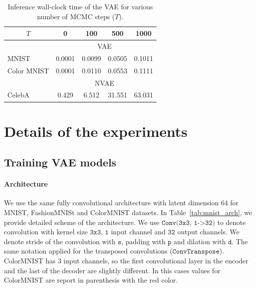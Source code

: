 \begin{table}[ht]
\begin{center}
\begin{small}
\begin{sc}
\caption{Inference wall-clock time of the VAE for various number of MCMC steps ($T$).}
\label{tab:inferece_time}
\begin{tabular}{l|cccc}
\toprule
\multicolumn{1}{c|}{$T$} &  0 & 100 & 500 &  1000 \\
\midrule
 & \multicolumn{4}{c}{VAE} \\
MNIST & 0.0001 & 0.0099 & 0.0505 & 0.1011\\
Color MNIST & 0.0001& 0.0110 & 0.0553 & 0.1111\\
\midrule
& \multicolumn{4}{c}{NVAE}  \\
CelebA & 0.429 & 6.512 & 31.551 & 63.031\\
\bottomrule
\end{tabular}  
\end{sc}
\end{small}
\end{center}
\end{table}

\newpage

\section{Details of the experiments} \label{appendix:experimental_details}
\subsection{Training VAE models} \label{appendix:beta_vae_param}

\paragraph{Architecture} We use the same fully convolutional architecture with latent dimension 64 for MNIST, FashionMNISt and ColorMNIST datasets. In Table~\ref{tab:mnist_arch}, we provide detailed scheme of the architecture. We use $\texttt{Conv(3x3, 1->32)}$ to denote convolution with kernel size $\texttt{3x3}$, $\texttt{1}$ input channel and  $\texttt{32}$ output channels. We denote stride of the convolution with $\texttt{s}$, padding with $\texttt{p}$ and dilation with $\texttt{d}$. The same notation applied for the transposed convolutions ($\texttt{ConvTranspose}$). ColorMNIST has 3 input channels, so the first convolutional layer in the encoder and the last of the decoder are slightly different. In this cases  values for ColorMNIST are report in parenthesis with the red color. 

